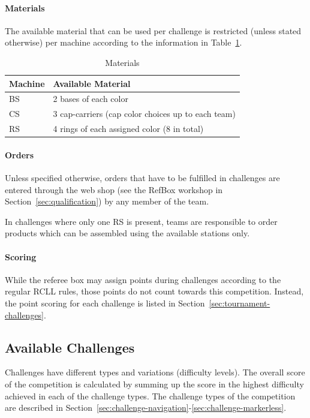 \documentclass[12pt,twoside]{article}
\newcommand{\refsec}[1]{Section~\ref{#1}}
\newcommand{\reftab}[1]{Table~\ref{#1}}
\begin{document}

\paragraph{Materials}\label{sec:materials}
The available material that can be used per challenge is restricted
(unless stated otherwise) per machine according to the information in
\reftab{tab:materials}.
\begin{table}[!htb]
 \centering
  \begin{tabularx}{\linewidth}{l|l}
   Machine & Available Material  \\\hline
   \ac{BS} & 2 bases of each color \\
   \ac{CS} & 3 cap-carriers (cap color choices up to each team)  \\
   \ac{RS} & 4 rings of each assigned color (8 in total)  \\
  \end{tabularx}
 \caption{Materials}
 \label{tab:materials}
\end{table}

\paragraph{Orders}
Unless specified otherwise, orders that have to be fulfilled in challenges
are entered through the web shop
(see the RefBox workshop in \refsec{sec:qualification})
by any member of the team.

In challenges where only one \ac{RS} is present, teams are responsible to
order products which can be assembled using the available stations only.

\paragraph{Scoring}\label{sec:scoring}
While the referee box may assign points during challenges according to the
regular RCLL rules, those points do not count towards this competition.
Instead, the point scoring for each challenge is listed in
\refsec{sec:tournament-challenges}.

\subsection{Available Challenges}
\label{sec:challenges}
Challenges have different types and variations (difficulty levels).
The overall score of the competition is calculated by summing up the score
in the highest difficulty achieved in each of the challenge types.
The challenge types of the competition are described in
\refsec{sec:challenge-navigation}-\ref{sec:challenge-markerless}.
\end{document}
